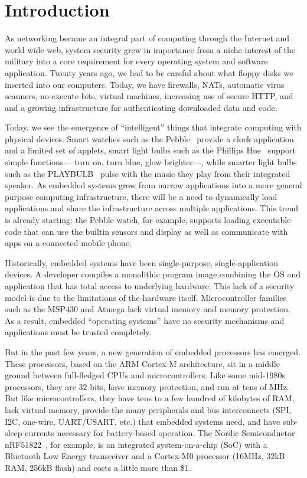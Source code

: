 \section{Introduction}

As networking became an integral part of computing through the Internet and
world wide web, system security grew in importance from a niche interest
of the military into a core requirement for every operating system and
software application. Twenty years ago, we had to be careful about what
floppy disks we inserted into our computers. Today, we have firewalls,
NATs, automatic virus scanners, no-execute bits, virtual machines,
increasing use of secure HTTP, and and a growing infrastructure for
authenticating downloaded data and code.

Today, we see the emergence of ``intelligent'' things that integrate
computing with physical devices. Smart watches such as the Pebble~\cite{pebble}
provide a clock application and a limited set of applets, smart light
bulbs such as the Phillips Hue~\cite{hue} support simple functions---
turn on, turn blue, glow brighter---,
while smarter light bulbs such as the PLAYBULB~\cite{playbulb}
pulse with the music they play from their integrated speaker.  As
embedded systems grow from narrow applications into a more general
purpose computing infrastructure, there will be a need to dynamically
load applications and share the infrastructure across multiple
applications.  This trend is already starting: the Pebble watch, for
example, supports loading executable code that can use the builtin
sensors and display as well as communicate with apps on a connected
mobile phone.

Historically, embedded systems have been single-purpose,
single-application devices.  A developer compiles a monolithic program
image combining the OS and application that has total access to
underlying hardware.  This lack of a security model is due to the
limitations of the hardware itself. Microcontroller families such as
the MSP430 and Atmega lack virtual memory and memory protection.  As a
result, embedded ``operating systems'' have no security mechanisms and
applications must be trusted completely.

But in the past few years, a new generation of embedded processors
has emerged. These processors, based on the ARM Cortex-M architecture,
sit in a middle ground between full-fledged CPUs and microcontrollers.
Like some mid-1980s processors, they are 32 bits, have memory protection, and
run at tens of MHz. But like microcontrollers, they have tens to
a few hundred of kilobytes of RAM, lack virtual memory,
provide the many peripherals
and bus interconnects (SPI, I2C, one-wire, UART/USART, etc.) that embedded
systems need, and
have sub-\uA sleep currents necessary for battery-based operation.
The Nordic Semiconductor nRF51822~\cite{nrf51822}, for example,
is an integrated system-on-a-chip (SoC) with a Bluetooth Low Energy
transceiver and a Cortex-M0 processor (16MHz, 32kB RAM, 256kB flash) and
costs a little more than \$1.

